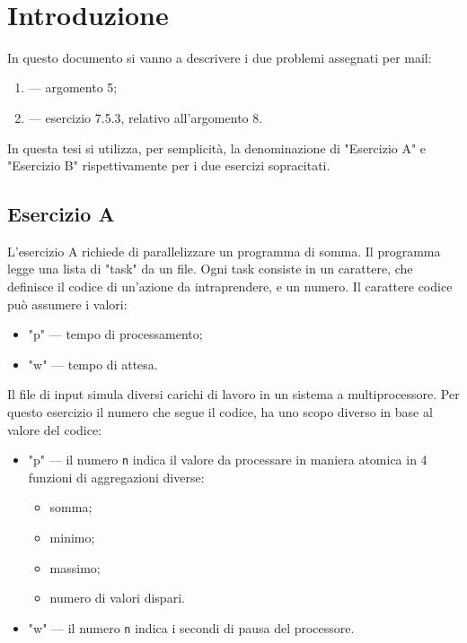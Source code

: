 \documentclass[12pt,a4paper]{article}
\begin{document}
\clearpage
\clearpage
\tableofcontents
\clearpage

\newpage
\
\newpage

\section{Introduzione}
In questo documento si vanno a descrivere i due problemi assegnati per mail:
\begin{enumerate}[label=\Alph*]
    \item — argomento 5;
    \item — esercizio 7.5.3, relativo all'argomento 8.
\end{enumerate}
In questa tesi si utilizza, per semplicità, la denominazione di "Esercizio A" e "Esercizio B" rispettivamente per i due esercizi sopracitati.

\subsection{Esercizio A}
L'esercizio A richiede di parallelizzare un programma di somma.
Il programma legge una lista di "task" da un file.
Ogni task consiste in un carattere, che definisce il codice di un'azione da intraprendere, e un numero. Il carattere codice può assumere i valori:
\begin{itemize}
    \item "p" — tempo di processamento;
    \item "w" — tempo di attesa.
\end{itemize}
Il file di input simula diversi carichi di lavoro in un sistema a multiprocessore.
Per questo esercizio il numero che segue il codice, ha uno scopo diverso in base al valore del codice:
\begin{itemize}
    \item "p" — il numero \texttt{n} indica il valore da processare in maniera atomica in 4 funzioni di aggregazioni diverse:
    \begin{itemize}
        \item somma;
        \item minimo;
        \item massimo;
        \item numero di valori dispari.
    \end{itemize}
    \item "w" — il numero \texttt{n} indica i secondi di pausa del processore.
\end{itemize}
\end{document}
